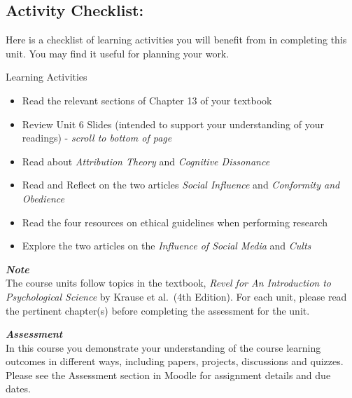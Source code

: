 \documentclass[
]{book}
\providecommand{\tightlist}{%
  \setlength{\itemsep}{0pt}\setlength{\parskip}{0pt}}
\begin{document}
\hypertarget{activity-checklist-5}{%
\subsection*{Activity Checklist:}\label{activity-checklist-5}}

Here is a checklist of learning activities you will benefit from in completing this unit. You may find it useful for planning your work.

\begin{reflect}
{Learning Activities}

\begin{itemize}
\tightlist
\item
  Read the relevant sections of Chapter 13 of your textbook
\item
  Review Unit 6 Slides (intended to support your understanding of your readings) - \emph{scroll to bottom of page}
\item
  Read about \emph{Attribution Theory} and \emph{Cognitive Dissonance}\\
\item
  Read and Reflect on the two articles \emph{Social Influence} and \emph{Conformity and Obedience}
\item
  Read the four resources on ethical guidelines when performing research
\item
  Explore the two articles on the \emph{Influence of Social Media} and \emph{Cults}
\end{itemize}
\end{reflect}

\begin{caution}
\textbf{\emph{Note}}\\
The course units follow topics in the textbook, \emph{Revel for An Introduction to Psychological Science} by Krause et al.~(4th Edition). For each unit, please read the pertinent chapter(s) before completing the assessment for the unit.
\end{caution}

\begin{assessment}
\textbf{\emph{Assessment}}\\
In this course you demonstrate your understanding of the course learning outcomes in different ways, including papers, projects, discussions and quizzes. Please see the Assessment section in Moodle for assignment details and due dates.
\end{assessment}
\end{document}
